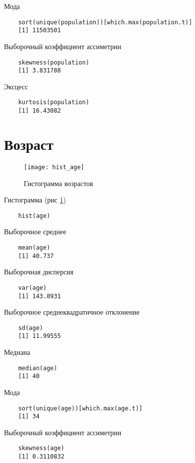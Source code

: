 \documentclass[12pt,a4paper,titlepage]{article}
\begin{document}
  Мода
  \begin{lstlisting}
    sort(unique(population))[which.max(population.t)]
    [1] 11503501
  \end{lstlisting}

  Выборочный коэффициент ассиметрии
  \begin{lstlisting}
    skewness(population)
    [1] 3.831788
  \end{lstlisting}

  Эксцесс
  \begin{lstlisting}
    kurtosis(population)
    [1] 16.43082
  \end{lstlisting}

\section{Возраст}
  \begin{figure}
    \texttt{[image: hist\_age]}
    \caption{Гистограмма возрастов}
    \label{age_hist}
  \end{figure}

  Гистограмма (рис \ref{age_hist})
  \begin{lstlisting}
    hist(age)
  \end{lstlisting}

  Выборочное среднее
  \begin{lstlisting}
    mean(age)
    [1] 40.737
  \end{lstlisting}

  Выборочная дисперсия
  \begin{lstlisting}
    var(age)
    [1] 143.8931
  \end{lstlisting}

  Выборочное среднеквадратичное отклонение
  \begin{lstlisting}
    sd(age)
    [1] 11.99555
  \end{lstlisting}

  Медиана
  \begin{lstlisting}
    median(age)
    [1] 40
  \end{lstlisting}

  Мода
  \begin{lstlisting}
    sort(unique(age))[which.max(age.t)]
    [1] 34
  \end{lstlisting}

  Выборочный коэффициент ассиметрии
  \begin{lstlisting}
    skewness(age)
    [1] 0.3110832
  \end{lstlisting}
\end{document}
